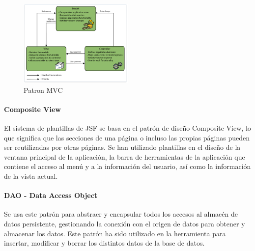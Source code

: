 \begin{figure}[H]
  \centering
  \includegraphics[width=0.50\textwidth]{imaxes/mvc-patron.png}
  \caption{Patron MVC}
  \label{fig:patron-mvc}
\end{figure}




    
\paragraph{Composite View}
El sistema de plantillas de JSF se basa en el patrón de diseño Composite View,
lo que significa que las secciones de una página o incluso las propias páginas pueden ser reutilizadas por otras páginas.
Se han utilizado plantillas en el diseño de la ventana principal de la aplicación, la barra de herramientas de la aplicación que contiene el acceso al menú y a la información del usuario, así como la información de la vista actual.



\paragraph{DAO - Data Access Object}
Se usa este patrón para abstraer y encapsular todos los accesos al almacén de datos persistente, gestionando la conexión con el origen de datos para obtener y almacenar los datos. 
Este patrón ha sido utilizado en la herramienta para insertar, modificar y borrar los distintos datos de la base de datos.



